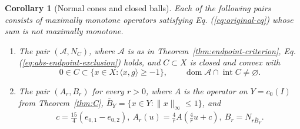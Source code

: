 \documentclass[11pt]{article}
\newcommand{\dom}{\operatorname{dom}}
\newcommand{\pair}[2]{\langle #1,#2\rangle}
\newtheorem{corollary}{Corollary}
\theoremstyle{definition}
\theoremstyle{remark}
\begin{document}
\begin{corollary}[Normal cones and closed balls]
\label{cor:normal-cone}
Each of the following pairs consists of maximally monotone operators satisfying Eq. (\ref{eq:original-cq}) whose sum is not maximally monotone.
\begin{enumerate}
\item\label{cor:nc-general} The pair $(\mathcal A,N_C)$, where $\mathcal A$ is as in Theorem~\ref{thm:endpoint-criterion}, Eq. (\ref{eq:abs-endpoint-exclusion}) holds, and $C\subset X$ is closed and convex with
\begin{equation}
0\in C\subset\{x\in X:\pair{x}{g}\ge-1\},
\qquad
\dom\mathcal A\cap\operatorname{int}C\ne\varnothing.
\label{eq:cor-nc-condition}
\end{equation}
\item\label{cor:nc-ball} The pair $(A_r,B_r)$ for every $r>0$, where $A$ is the operator on $Y=c_0(I)$ from Theorem~\ref{thm:C}, $\overline B_Y=\{x\in Y:\|x\|_\infty\le1\}$, and
\begin{equation}
\begin{aligned}
c=\frac{15}{4}(e_{0,1}-e_{0,2}),~A_r(u)=\frac4r A\left(\frac4r u+c\right),~B_r=N_{r\overline B_Y}.
\end{aligned}
\label{eq:cor-ball-operators}
\end{equation}
\end{enumerate}
\end{corollary}
\end{document}
